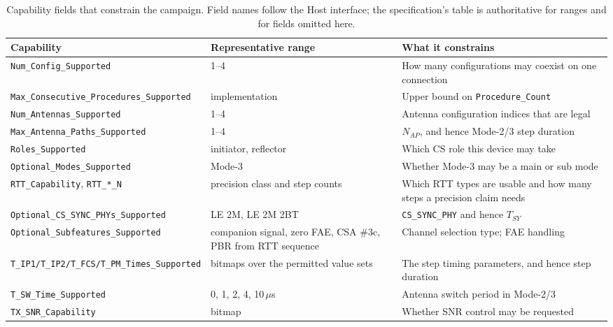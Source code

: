 \documentclass[11pt,a4paper]{article}
\newcommand{\us}{\,\ensuremath{\upmu}s}
\newcommand{\code}[1]{\texttt{\small #1}}
\newcommand{\Tsy}{T_{SY}}
\newcommand{\Nap}{N_{AP}}
\providecommand{\upmu}{\mu}
\begin{document}
\begin{table}[h]
\caption{Capability fields that constrain the campaign. Field names follow the Host interface; the
specification's table is authoritative for ranges and for fields omitted here.}
\label{tab:caps}
\centering\small
\begin{tabular}{@{}L{47mm}L{38mm}L{47mm}@{}}
\toprule
Capability & Representative range & What it constrains \\
\midrule
\code{Num\_Config\_Supported} & 1--4 & How many configurations may coexist on one connection \\
\code{Max\_Consecutive\_}\newline\code{Procedures\_Supported} & implementation & Upper bound on \code{Procedure\_Count} \\
\code{Num\_Antennas\_Supported} & 1--4 & Antenna configuration indices that are legal \\
\code{Max\_Antenna\_Paths\_Supported} & 1--4 & $\Nap$, and hence Mode-2/3 step duration \\
\code{Roles\_Supported} & initiator, reflector & Which CS role this device may take \\
\code{Optional\_Modes\_Supported} & Mode-3 & Whether Mode-3 may be a main or sub mode \\
\code{RTT\_Capability}, \code{RTT\_*\_N} & precision class and step counts & Which RTT types are usable and how many steps a precision claim needs \\
\code{Optional\_CS\_SYNC\_}\newline\code{PHYs\_Supported} & LE 2M, LE 2M 2BT & \code{CS\_SYNC\_PHY} and hence $\Tsy$ \\
\code{Optional\_Subfeatures\_}\newline\code{Supported} & companion signal, zero FAE, CSA \#3c, PBR from RTT sequence & Channel selection type; FAE handling \\
\code{T\_IP1/T\_IP2/T\_FCS/}\newline\code{T\_PM\_Times\_Supported} & bitmaps over the permitted value sets & The step timing parameters, and hence step duration \\
\code{T\_SW\_Time\_Supported} & 0, 1, 2, 4, 10\us & Antenna switch period in Mode-2/3 \\
\code{TX\_SNR\_Capability} & bitmap & Whether SNR control may be requested \\
\bottomrule
\end{tabular}
\end{table}
\end{document}

